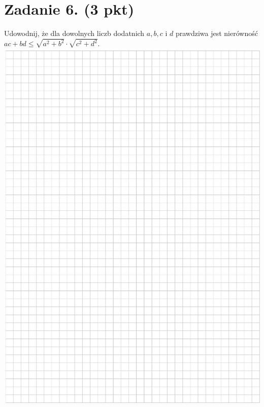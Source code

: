 \documentclass[10pt]{article}
\begin{document}
\section*{Zadanie 6. (3 pkt)}
Udowodnij, że dla dowolnych liczb dodatnich \(a, b, c\) i \(d\) prawdziwa jest nierówność \(a c+b d \leq \sqrt{a^{2}+b^{2}} \cdot \sqrt{c^{2}+d^{2}}\).\\
\includegraphics[max width=\textwidth, center]{2024_11_21_d9af6ed2d610d3f2d2cbg-09}
\end{document}
